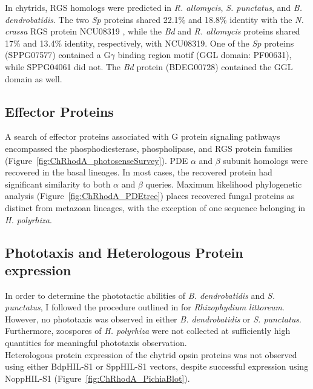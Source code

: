\indent In chytrids, RGS homologs were predicted in \textit{R. allomycis}, \textit{S. punctatus}, and \textit{B. dendrobatidis}. The two \textit{Sp} proteins shared 22.1\% and 18.8\% identity with the \textit{N. crassa} RGS protein NCU08319 \cite{Borkovich2004}, while the \textit{Bd} and \textit{R. allomycis} proteins shared 17\% and 13.4\% identity, respectively, with NCU08319. One of the \textit{Sp} proteins (SPPG07577) contained a G$\gamma$ binding region motif (GGL domain: PF00631), while SPPG04061 did not. The \textit{Bd} protein (BDEG00728) contained the GGL domain as well.\\

\subsection*{Effector Proteins}
A search of effector proteins associated with G protein signaling pathways encompassed the phosphodiesterase, phospholipase, 
and RGS protein families (Figure~\ref{fig:ChRhodA_photosenseSurvey}). PDE $\alpha$ and $\beta$ subunit homologs were recovered 
in the basal lineages. In most cases, the recovered protein had significant similarity to both $\alpha$ and $\beta$ queries. 
Maximum likelihood phylogenetic analysis (Figure~\ref{fig:ChRhodA_PDEtree}) places recovered fungal proteins as distinct from metazoan lineages, with the exception of one sequence belonging in \textit{H. polyrhiza}.\\ 

\subsection*{Phototaxis and Heterologous Protein expression}
In order to determine the phototactic abilities of \textit{B. dendrobatidis} and \textit{S. punctatus}, I followed the procedure outlined in \cite{Muehlstein1987} for \textit{Rhizophydium littoreum}. However, no phototaxis was observed in either \textit{B. dendrobatidis} or \textit{S. punctatus}. Furthermore, zoospores of \textit{H. polyrhiza} were not collected at sufficiently high quantities for meaningful phototaxis observation.\\
\indent Heterologous protein expression of the chytrid opsin proteins was not observed using either BdpHIL-S1 or SppHIL-S1 vectors, despite successful expression using NoppHIL-S1 (Figure~\ref{fig:ChRhodA_PichiaBlot}).\\ 

